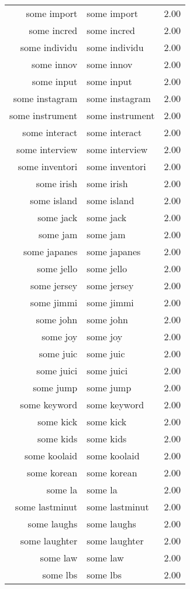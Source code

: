 \begin{table}[ht]
\begin{tabular}{rlr}
  some import & some import & 2.00 \\ 
  some incred & some incred & 2.00 \\ 
  some individu & some individu & 2.00 \\ 
  some innov & some innov & 2.00 \\ 
  some input & some input & 2.00 \\ 
  some instagram & some instagram & 2.00 \\ 
  some instrument & some instrument & 2.00 \\ 
  some interact & some interact & 2.00 \\ 
  some interview & some interview & 2.00 \\ 
  some inventori & some inventori & 2.00 \\ 
  some irish & some irish & 2.00 \\ 
  some island & some island & 2.00 \\ 
  some jack & some jack & 2.00 \\ 
  some jam & some jam & 2.00 \\ 
  some japanes & some japanes & 2.00 \\ 
  some jello & some jello & 2.00 \\ 
  some jersey & some jersey & 2.00 \\ 
  some jimmi & some jimmi & 2.00 \\ 
  some john & some john & 2.00 \\ 
  some joy & some joy & 2.00 \\ 
  some juic & some juic & 2.00 \\ 
  some juici & some juici & 2.00 \\ 
  some jump & some jump & 2.00 \\ 
  some keyword & some keyword & 2.00 \\ 
  some kick & some kick & 2.00 \\ 
  some kids & some kids & 2.00 \\ 
  some koolaid & some koolaid & 2.00 \\ 
  some korean & some korean & 2.00 \\ 
  some la & some la & 2.00 \\ 
  some lastminut & some lastminut & 2.00 \\ 
  some laughs & some laughs & 2.00 \\ 
  some laughter & some laughter & 2.00 \\ 
  some law & some law & 2.00 \\ 
  some lbs & some lbs & 2.00 \\ 

\end{tabular}
\end{table}
